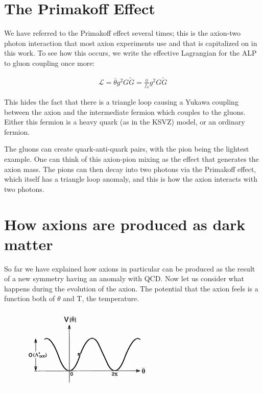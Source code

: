 \documentclass[12pt,twosides]{book}
\begin{document}
\section{The Primakoff Effect}

We have referred to the Primakoff effect several times; this is the axion-two photon interaction that most axion experiments use and that is capitalized on in this work. To see how this occurs, we write the effective Lagrangian for the ALP to gluon coupling once more:

\begin{align*}
\mathcal{L} = \bar \theta g^2 G \tilde G = \frac{a}{f_a} g^2 G \tilde G
\end{align*}

This hides the fact that there is a triangle loop causing a Yukawa coupling between the axion and the intermediate fermion which couples to the gluons. Either this fermion is a heavy quark (as in the KSVZ) model, or an ordinary fermion.

The gluons can create quark-anti-quark pairs, with the pion being the lightest example. One can think of this axion-pion mixing as the effect that generates the axion mass. The pions can then decay into two photons via the Primakoff effect, which itself has a triangle loop anomaly, and this is how the axion interacts with two photons.

\section{How axions are produced as dark matter}

So far we have explained how axions in particular can be produced as the result of a new symmetry having an anomaly with QCD. Now let us consider what happens during the evolution of the axion. The potential that the axion feels is a function both of $\theta$ and T, the temperature. 

\begin{figure}
\includegraphics[width=0.6\textwidth]{vthetavstheta}
\end{figure}
\end{document}
